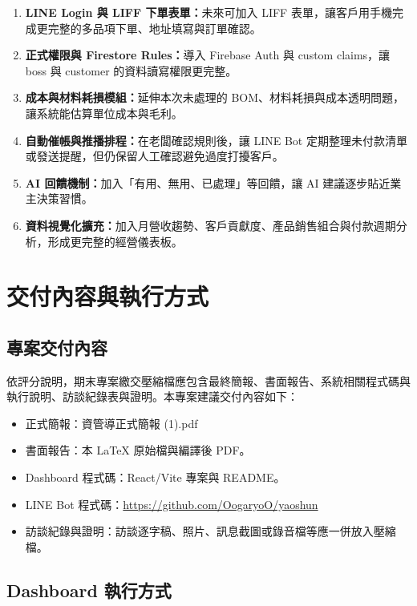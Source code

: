 \documentclass[12pt,a4paper,UTF8,fontset=none]{ctexart}
\newcommand{\code}[1]{{\ttfamily\small #1}}
\newcommand{\linkurl}[1]{\href{#1}{#1}}
\begin{document}
\begin{enumerate}
  \item \textbf{LINE Login 與 LIFF 下單表單：}未來可加入 LIFF 表單，讓客戶用手機完成更完整的多品項下單、地址填寫與訂單確認。
  \item \textbf{正式權限與 Firestore Rules：}導入 Firebase Auth 與 custom claims，讓 boss 與 customer 的資料讀寫權限更完整。
  \item \textbf{成本與材料耗損模組：}延伸本次未處理的 BOM、材料耗損與成本透明問題，讓系統能估算單位成本與毛利。
  \item \textbf{自動催帳與推播排程：}在老闆確認規則後，讓 LINE Bot 定期整理未付款清單或發送提醒，但仍保留人工確認避免過度打擾客戶。
  \item \textbf{AI 回饋機制：}加入「有用、無用、已處理」等回饋，讓 AI 建議逐步貼近業主決策習慣。
  \item \textbf{資料視覺化擴充：}加入月營收趨勢、客戶貢獻度、產品銷售組合與付款週期分析，形成更完整的經營儀表板。
\end{enumerate}

\section{交付內容與執行方式}

\subsection{專案交付內容}

依評分說明，期末專案繳交壓縮檔應包含最終簡報、書面報告、系統相關程式碼與執行說明、訪談紀錄表與證明。本專案建議交付內容如下：

\begin{itemize}
  \item 正式簡報：\code{資管導正式簡報 (1).pdf}
  \item 書面報告：本 LaTeX 原始檔與編譯後 PDF。
  \item Dashboard 程式碼：React/Vite 專案與 README。
  \item LINE Bot 程式碼：\linkurl{https://github.com/OogaryoO/yaoshun}
  \item 訪談紀錄與證明：訪談逐字稿、照片、訊息截圖或錄音檔等應一併放入壓縮檔。
\end{itemize}

\subsection{Dashboard 執行方式}
\end{document}
